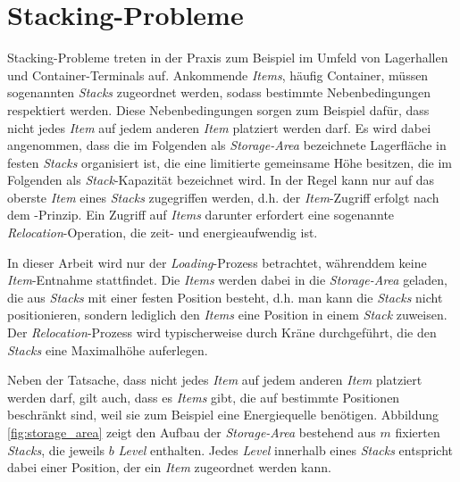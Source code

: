 \section{Stacking-Probleme}
\label{sec:stacking_problems}

Stacking-Probleme treten in der Praxis zum Beispiel im Umfeld von Lagerhallen und Container-Terminals auf.
Ankommende \textit{Items}, häufig Container, müssen sogenannten \textit{Stacks} zugeordnet werden, sodass bestimmte Nebenbedingungen respektiert werden. Diese Nebenbedingungen sorgen zum Beispiel dafür, dass nicht jedes \textit{Item} auf jedem anderen \textit{Item} platziert werden
darf. Es wird dabei angenommen, dass die im Folgenden als \textit{Storage-Area} bezeichnete Lagerfläche in festen
\textit{Stacks} organisiert ist, die eine limitierte gemeinsame Höhe besitzen, die im Folgenden als \textit{Stack}-Kapazität bezeichnet wird.
In der Regel kann nur auf das oberste \textit{Item} eines \textit{Stacks} zugegriffen werden, d.h. der \textit{Item}-Zugriff erfolgt
nach dem -Prinzip. Ein Zugriff auf \textit{Items} darunter erfordert eine sogenannte \textit{Relocation}-Operation,
die zeit- und energieaufwendig ist.

In dieser Arbeit wird nur der \textit{Loading}-Prozess betrachtet, währenddem keine \textit{Item}-Entnahme stattfindet.
Die \textit{Items} werden dabei in die \textit{Storage-Area} geladen, die aus \textit{Stacks} mit einer festen Position besteht, d.h.
man kann die \textit{Stacks} nicht positionieren, sondern lediglich den \textit{Items} eine Position in einem \textit{Stack} zuweisen.
Der \textit{Relocation}-Prozess wird typischerweise durch Kräne durchgeführt, die den \textit{Stacks} eine Maximalhöhe auferlegen.

Neben der Tatsache, dass nicht jedes \textit{Item} auf jedem anderen \textit{Item} platziert werden darf, gilt auch, dass es \textit{Items} gibt, die auf bestimmte Positionen beschränkt sind, weil sie zum Beispiel eine Energiequelle benötigen.
Abbildung \ref{fig:storage_area} zeigt den Aufbau der \textit{Storage-Area} bestehend aus $m$ fixierten
\textit{Stacks}, die jeweils $b$ \textit{Level} enthalten. Jedes \textit{Level} innerhalb eines \textit{Stacks} entspricht dabei einer Position, der ein \textit{Item} zugeordnet werden kann.

